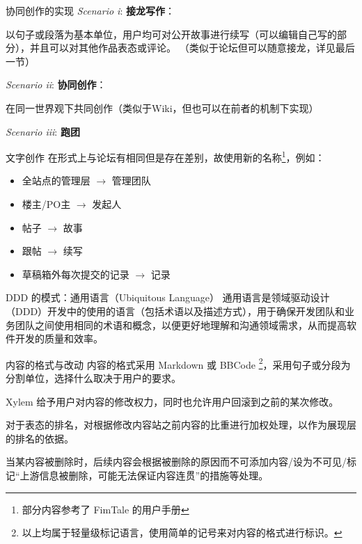 \documentclass[UTF8]{ctexbeamer}
\begin{document}
\begin{frame}{协同创作的实现}
\emph{Scenario i}: \textbf{接龙写作}：

以句子或段落为基本单位，用户均可对公开故事进行续写（可以编辑自己写的部分），并且可以对其他作品表态或评论。
（类似于论坛但可以随意接龙，详见最后一节）

\emph{Scenario ii}: \textbf{协同创作}：

在同一世界观下共同创作（类似于Wiki，但也可以在前者的机制下实现）


\emph{Scenario iii}: \textbf{跑团}
\end{frame}

\begin{frame}{文字创作}
在形式上与论坛有相同但是存在差别，故使用新的名称\footnote[1]{部分内容参考了 FimTale 的用户手册}，例如：

\begin{itemize}
  \item 全站点的管理层 $\rightarrow$ 管理团队
  \item 楼主/PO主 $\rightarrow$ 发起人
  \item 帖子 $\rightarrow$ 故事
  \item 跟帖 $\rightarrow$ 续写
  \item 草稿箱外每次提交的记录 $\rightarrow$ 记录
\end{itemize}

\begin{block}{DDD 的模式：通用语言（Ubiquitous Language）}
通用语言是领域驱动设计（DDD）开发中的使用的语言（包括术语以及描述方式），用于确保开发团队和业务团队之间使用相同的术语和概念，以便更好地理解和沟通领域需求，从而提高软件开发的质量和效率。
\end{block}
\end{frame}

\begin{frame}{内容的格式与改动}
内容的格式采用 Markdown 或 BBCode \footnote[1]{以上均属于轻量级标记语言，使用简单的记号来对内容的格式进行标识。}，采用句子或分段为分割单位，选择什么取决于用户的要求。

Xylem 给予用户对内容的修改权力，同时也允许用户回滚到之前的某次修改。

对于表态的排名，对根据修改内容站之前内容的比重进行加权处理，以作为展现层的排名的依据。

当某内容被删除时，后续内容会根据被删除的原因而不可添加内容/设为不可见/标记“上游信息被删除，可能无法保证内容连贯”的措施等处理。
\end{frame}
\end{document}
